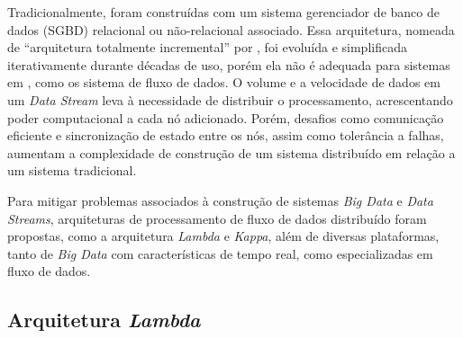 
Tradicionalmente, 
foram construídas com um sistema gerenciador de
banco de dados (SGBD) relacional ou não-relacional associado.
Essa arquitetura,
nomeada de ``arquitetura totalmente incremental'' por ,
foi evoluída e simplificada iterativamente durante décadas de uso, porém ela não
é adequada para sistemas em 
, como os sistema de fluxo de dados.
O volume e a velocidade de dados em um \emph{Data Stream} leva à necessidade de
distribuir o processamento, acrescentando poder computacional a cada nó
adicionado.
Porém, desafios como comunicação eficiente e sincronização de estado
entre os nós, assim como tolerância a falhas, aumentam a complexidade de
construção de um sistema distribuído em relação a um sistema tradicional.


\newcommand{\lambdaa}{\xspace\emph{Lambda}\xspace}
\newcommand{\kappaa}{\xspace\emph{Kappa}\xspace}

Para mitigar problemas associados à construção de sistemas \emph{Big Data}
e \emph{Data Streams},
arquiteturas de processamento de fluxo
de dados distribuído foram propostas, como a arquitetura \lambdaa
\cite{marz2015big} e \kappaa \cite{Kreps2014}, além
de
diversas plataformas, tanto de \emph{Big Data} com características de tempo real,
como especializadas em fluxo de dados.


\subsection{Arquitetura \lambdaa {}}

